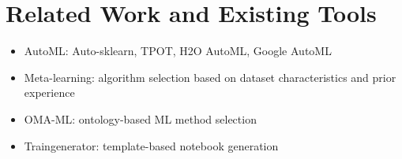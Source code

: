 \section{Related Work and Existing Tools}
\begin{itemize}
    \item AutoML: Auto-sklearn, TPOT, H2O AutoML, Google AutoML
    \item Meta-learning: algorithm selection based on dataset 
    characteristics and prior experience
    \item OMA-ML: ontology-based ML method selection
    \item Traingenerator: template-based notebook generation
\end{itemize}

